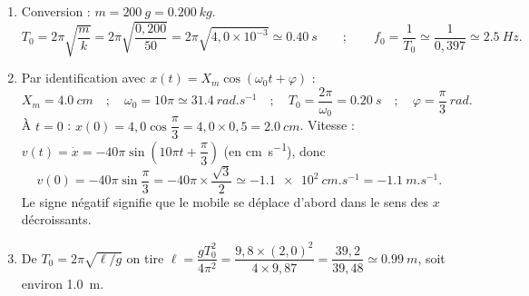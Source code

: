 \documentclass[11pt]{article}
\begin{document}
\begin{corrige}
\begin{enumerate}
\item Conversion : $m = \SI{200}{g} = \SI{0,200}{kg}$.
\[ T_0 = 2\pi\sqrt{\dfrac{m}{k}} = 2\pi\sqrt{\dfrac{0{,}200}{50}} = 2\pi\sqrt{4{,}0\times 10^{-3}} \simeq \SI{0,40}{s} \qquad ; \qquad f_0 = \dfrac{1}{T_0} \simeq \dfrac{1}{0{,}397} \simeq \SI{2,5}{Hz}. \]
\item Par identification avec $x(t) = X_m\cos(\omega_0 t + \varphi)$ :
\[ X_m = \SI{4,0}{cm} \quad ; \quad \omega_0 = 10\pi \simeq \SI{31,4}{rad.s^{-1}} \quad ; \quad T_0 = \dfrac{2\pi}{\omega_0} = \SI{0,20}{s} \quad ; \quad \varphi = \dfrac{\pi}{3}\ \si{rad}. \]
À $t=0$ : $x(0) = 4{,}0\cos\dfrac{\pi}{3} = 4{,}0\times 0{,}5 = \SI{2,0}{cm}$.
Vitesse : $v(t) = \dot{x} = -40\pi\sin\left(10\pi t + \dfrac{\pi}{3}\right)$ (en \si{cm.s^{-1}}), donc
\[ v(0) = -40\pi\sin\dfrac{\pi}{3} = -40\pi\times\dfrac{\sqrt{3}}{2} \simeq \SI{-1,1e2}{cm.s^{-1}} = \SI{-1,1}{m.s^{-1}}. \]
Le signe négatif signifie que le mobile se déplace d'abord dans le sens des $x$ décroissants.
\item De $T_0 = 2\pi\sqrt{\ell/g}$ on tire $\ell = \dfrac{gT_0^2}{4\pi^2} = \dfrac{9{,}8\times (2{,}0)^2}{4\times 9{,}87} = \dfrac{39{,}2}{39{,}48} \simeq \SI{0,99}{m}$, soit environ \SI{1,0}{m}.
\end{enumerate}
\end{corrige}
\end{document}
